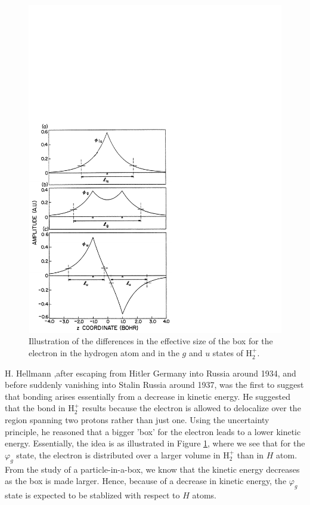 \begin{figure}
\includegraphics[scale=0.75]{fig2-15}
\caption{Illustration of the differences in the effective size of the
  box for the electron in the hydrogen atom and in the $g$ and $u$
  states of H$_2^+$.}
\label{fig2-15}
\end{figure}

H. Hellmann \cite{hellmann},after escaping from Hitler Germany into
Russia around 1934, and before suddenly vanishing into Stalin Russia
around 1937, was the first to suggest that bonding arises essentially
from a decrease in kinetic energy. He suggested that the bond in
H$^+_2$ results because the electron is allowed to delocalize over the
region spanning two protons rather than just one. Using the
uncertainty principle, he reasoned that a bigger 'box' for the
electron leads to a lower kinetic energy. Essentially, the idea is as
illustrated in Figure \ref{fig2-15}, where we see that for the
$\varphi_g$ state, the electron is distributed over a larger volume in
H$^+_2$ than in $H$ atom.  From the study of a particle-in-a-box, we
know that the kinetic energy decreases as the box is made
larger. Hence, because of a decrease in kinetic energy, the
$\varphi_g$ state is expected to be stablized with respect to $H$
atoms.
    
